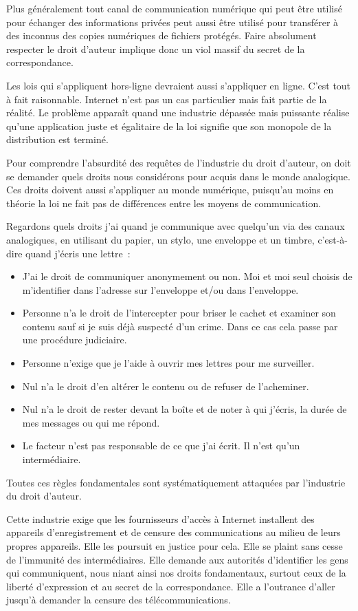 Plus généralement tout canal de communication numérique qui peut être utilisé pour échanger des
informations privées peut aussi être utilisé pour transférer à des inconnus des copies numériques de
fichiers protégés. Faire absolument respecter le droit d’auteur implique donc un viol massif du
secret de la correspondance. 

Les lois qui s’appliquent hors-ligne devraient aussi s'appliquer en ligne. C’est tout à fait raisonnable. Internet n’est pas un cas particulier mais fait partie de la réalité. Le problème apparaît quand une industrie dépassée mais puissante réalise qu’une application juste et égalitaire de la loi signifie que son monopole de la
distribution est terminé.

Pour comprendre l’absurdité des requêtes de l’industrie du droit d’auteur, on doit se demander quels
droits nous considérons pour acquis dans le monde analogique. Ces droits doivent aussi s’appliquer
au monde numérique, puisqu’au moins en théorie la loi ne fait pas de différences entre les moyens
de communication.

Regardons quels droits j’ai quand je communique avec quelqu’un via des canaux analogiques, en
utilisant du papier, un stylo, une enveloppe et un timbre, c’est-à-dire quand j’écris une lettre~:

\begin{itemize}
\item 
J’ai le droit de communiquer anonymement ou non. Moi et moi seul choisis de m’identifier dans
l’adresse sur l’enveloppe et/ou dans l’enveloppe.\item
Personne n’a le droit de l’intercepter pour briser le cachet et examiner son contenu sauf si je suis
déjà suspecté d’un crime. Dans ce cas cela passe par une procédure judiciaire.\item
Personne n’exige que je l’aide à ouvrir mes lettres pour me surveiller.\item
Nul n’a le droit d’en altérer le contenu ou de refuser de l’acheminer.\item
Nul n’a le droit de rester devant la boîte et de noter à qui j’écris, la durée de mes messages ou
qui me répond.\item
Le facteur n’est pas responsable de ce que j’ai écrit. Il n’est qu’un intermédiaire.\end{itemize}

Toutes ces règles fondamentales sont systématiquement attaquées par l’industrie du droit d’auteur.

Cette industrie exige que les fournisseurs d’accès à Internet installent des appareils
d’enregistrement et de censure des communications au milieu de leurs propres appareils. Elle les
poursuit en justice pour cela. Elle se plaint sans cesse de l’immunité des intermédiaires. Elle
demande aux autorités d’identifier les gens qui communiquent, nous niant ainsi nos droits
fondamentaux, surtout ceux de la liberté d’expression et au secret de la correspondance. Elle a
l’outrance d’aller jusqu’à demander la censure des télécommunications.

